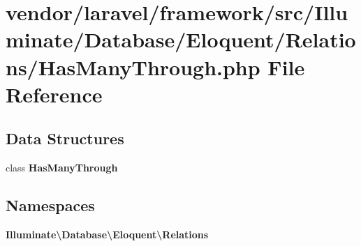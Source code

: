 \section{vendor/laravel/framework/src/\+Illuminate/\+Database/\+Eloquent/\+Relations/\+Has\+Many\+Through.php File Reference}
\label{_has_many_through_8php}
\subsection*{Data Structures}
\begin{DoxyCompactItemize}
\item 
class {\bf Has\+Many\+Through}
\end{DoxyCompactItemize}
\subsection*{Namespaces}
\begin{DoxyCompactItemize}
\item 
 {\bf Illuminate\textbackslash{}\+Database\textbackslash{}\+Eloquent\textbackslash{}\+Relations}
\end{DoxyCompactItemize}
